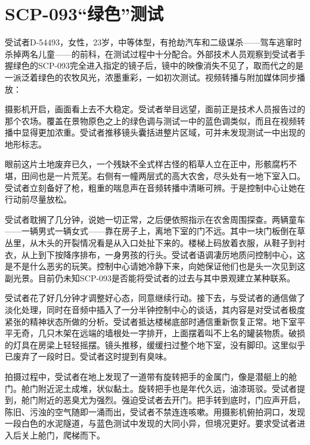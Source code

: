 \section{SCP-093“绿色”测试}

\label{sec:DOC-scp-093-green-test}


受试者D-54493，女性，23岁，中等体型，有抢劫汽车和二级谋杀——驾车逃窜时杀掉两名儿童——的前科，在测试过程中十分配合。外部技术人员观察到受试者手握绿色的SCP-093完全进入指定的镜子后，镜中的映像消失不见了，取而代之的是一派泛着绿色的农牧风光，浓墨重彩，一如初次测试。视频转播与附加媒体同步播放：

\begin{scpbox}

摄影机开启，画面看上去不大稳定。受试者举目远望，面前正是技术人员报告过的那个农场。覆盖在景物原色之上的绿色调与测试一中的蓝色调类似，而且在视频转播中显得更加浓重。受试者推移镜头囊括进整片区域，可并未发现测试一中出现的地形标志。

眼前这片土地废弃已久，一个残缺不全式样古怪的稻草人立在正中，形骸腐朽不堪，田间也是一片荒芜。右侧有一幢两层式的高大农舍，尽头处有一地下室入口。受试者立刻备好了枪，粗重的喘息声在音频转播中清晰可辨。于是控制中心让她在行动前尽量放松。

受试者耽搁了几分钟，说她一切正常，之后便依照指示在农舍周围探查。两辆童车——一辆男式一辆女式——靠在房子上，离地下室的门不远。其中一块门板倒在草丛里，从木头的开裂情况看是从入口处扯下来的。楼梯上码放着衣服，从鞋子到衬衣，从上到下按降序排布，一身男孩的行头。受试者语调凄厉地质问控制中心，这是不是什么恶劣的玩笑。控制中心请她冷静下来，向她保证他们也是头一次见到这副光景。目前仍未知SCP-093是否能将受试者的过去与其中景观建立某种联系。

受试者花了好几分钟才调整好心态，同意继续行动。接下去，与受试者的通信做了淡化处理，同时在音频中插入了一分半钟控制中心的谈话，其内容是对受试者极度紧张的精神状态所做的分析。受试者抵达楼梯底部时通信重新恢复正常。地下室平平无奇，几只木架在远端的墙根处一字排开，上面摆着叫不上名的罐装物质。破损的灯具在房梁上轻轻摇摆。镜头推移，缓缓扫过整个地下室，没有脚印。这里似乎已废弃了一段时日。受试者这时提到有臭味。

拍摄过程中，受试者在地上发现了一道带有旋转把手的金属门，像是潜艇上的舱门。舱门附近泥土成堆，状似黏土。旋转把手也是年代久远，油漆斑驳。受试者提到，舱门附近的恶臭尤为强烈。强迫受试者去开门。把手转到底时，门应声开启，陈旧、污浊的空气随即一涌而出，受试者不禁连连咳嗽。用摄影机俯拍洞口，发现一段白色的水泥隧道，与蓝色测试中发现的大同小异，但境况更好。要求受试者进入后关上舱门，爬梯而下。


\end{scpbox}
